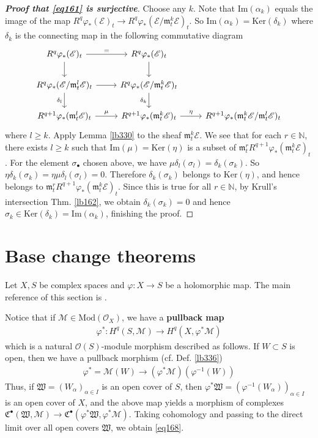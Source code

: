 \documentclass[12pt,b5paper,notitlepage]{report}
\theoremstyle{definition}
\theoremstyle{plain}
\newcommand{\fk}{\mathfrak}
\newcommand{\scr}{\mathscr}
\newcommand{\blt}{\bullet}
\newcommand{\Nbb}{\mathbb N}
\newcommand{\Ker}{\mathrm{Ker}}
\newcommand{\Imag}{\mathrm{Im}}
\newcommand{\Mod}{\mathrm{Mod}}
\newcommand{\mk}{\mathfrak m}
\numberwithin{equation}{section}
\begin{document}
\begin{proof}[\textbf{Proof that \eqref{eq161} is surjective}]
Choose any $k$. Note that $\Imag(\alpha_k)$ equals the image of the map $R^q\varphi_*(\scr E)_t\rightarrow R^q\varphi_*(\scr E/\mk_t^k\scr E)_t$. So $\Imag(\alpha_k)=\Ker(\delta_k)$ where $\delta_k$ is the connecting map in the following commutative diagram
\begin{equation*}
\begin{tikzcd}
R^q\varphi_*(\scr E)_t \arrow[r,"="] \arrow[d]  & R^q\varphi_*(\scr E)_t \arrow[d]  &   \\
R^q\varphi_*(\scr E/\mk_t^l\scr E)_t \arrow[r] \arrow[d,"\delta_l"'] & R^q\varphi_*(\scr E/\mk_t^k\scr E)_t \arrow[d,"\delta_k"'] &   \\
R^{q+1}\varphi_*(\mk_t^l\scr E)_t \arrow[r,"\mu"]           & R^{q+1}\varphi_*(\mk_t^k\scr E)_t \arrow[r,"\eta"] & R^{q+1}\varphi_*(\mk_t^k\scr E/\mk_t^l\scr E)_t
\end{tikzcd}
\end{equation*}
where $l\geq k$. Apply Lemma \ref{lb330} to the sheaf $\mk_t^k\scr E$. We see that for each $r\in\Nbb$, there exists $l\geq k$  such that $\Imag(\mu)=\Ker(\eta)$ is a subset of $\mk_t^r R^{q+1}\varphi_*(\mk_t^k\scr E)_t$. For the element $\sigma_\blt$ chosen above, we have $\mu\delta_l(\sigma_l)=\delta_k(\sigma_k)$. So $\eta\delta_k(\sigma_k)=\eta\mu\delta_l(\sigma_l)=0$. Therefore $\delta_k(\sigma_k)$ belongs to $\Ker(\eta)$, and hence belongs to $\mk_t^r R^{q+1}\varphi_*(\mk_t^k\scr E)_t$. Since this is true for all $r\in\Nbb$, by Krull's intersection Thm. \ref{lb162}, we obtain $\delta_k(\sigma_k)=0$ and hence $\sigma_k\in\Ker(\delta_k)=\Imag(\alpha_k)$, finishing the proof.
\end{proof}



\section{Base change theorems}\label{lb357}


Let $X,S$ be complex spaces and $\varphi:X\rightarrow S$ be a holomorphic map. The main reference of this section is \cite[Sec. III.3]{BS}.

Notice that if $\scr M\in\Mod(\scr O_X)$, we have a \textbf{pullback map} 
\begin{align}
\varphi^*:H^q(S,\scr M)\rightarrow H^q(X,\varphi^*\scr M)   \label{eq168}
\end{align}
which is a natural $\scr O(S)$-module morphism described as follows. If $W\subset S$ is open, then we have a pullback morphism (cf. Def. \ref{lb336})
\begin{align*}
\varphi^*=\scr M(W)\rightarrow(\varphi^*\scr M)(\varphi^{-1}(W))
\end{align*}
Thus, if $\fk W=(W_\alpha)_{\alpha\in I}$ is an open cover of $S$, then $\varphi^*\fk W=(\varphi^{-1}(W_\alpha))_{\alpha\in I}$ is an open cover of $X$, and the above map yields a morphism of complexes $\fk C^\blt(\fk W,\scr M)\rightarrow \fk C^\blt(\varphi^*\fk W,\varphi^*\scr M)$. Taking cohomology and passing to the direct limit over all open covers $\fk W$, we obtain \eqref{eq168}.
\end{document}
